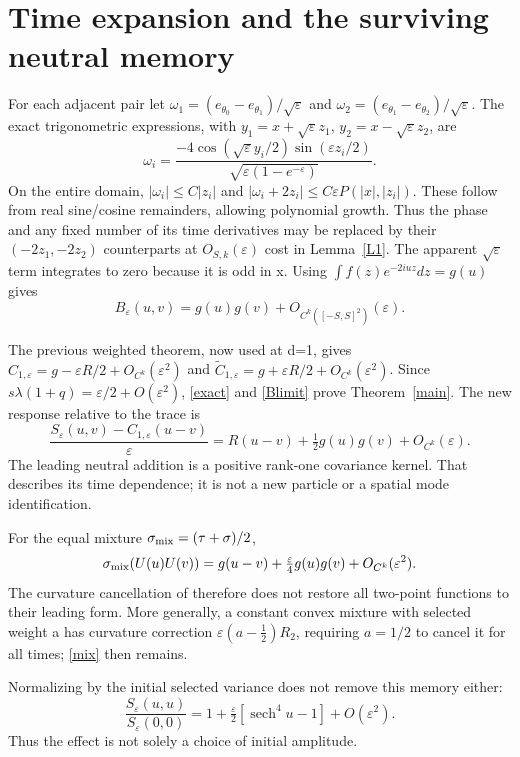\documentclass[11pt]{article}
\newcommand{\eps}{\varepsilon}
\newcommand{\sech}{\operatorname{sech}}
\newcommand{\tr}{\tau}
\begin{document}
\newpage
\section{Time expansion and the surviving neutral memory}
For each adjacent pair let
$\omega_1=(e_{\theta_0}-e_{\theta_1})/\sqrt\eps$ and
$\omega_2=(e_{\theta_1}-e_{\theta_2})/\sqrt\eps$.
The exact trigonometric expressions, with
$y_1=x+\sqrt\eps z_1$, $y_2=x-\sqrt\eps z_2$, are
\[
 \omega_i=
 \frac{-4\cos(\sqrt\eps y_i/2)\sin(\eps z_i/2)}
      {\sqrt{\eps(1-e^{-\eps})}}.
\]
On the entire domain, $|\omega_i|\le C|z_i|$ and
$|\omega_i+2z_i|\le C\eps P(|x|,|z_i|)$.
These follow from real sine/cosine remainders, allowing polynomial
growth. Thus the phase and any fixed number of its time derivatives
may be replaced by their $(-2z_1,-2z_2)$ counterparts at
$O_{S,k}(\eps)$ cost in Lemma~\ref{L1}. The apparent
$\sqrt\eps$ term integrates to zero because it is odd in x.
Using $\int f(z)e^{-2iuz}dz=g(u)$ gives
\begin{equation}\label{Blimit}
 B_\eps(u,v)=g(u)g(v)+O_{C^k([-S,S]^2)}(\eps).
\end{equation}

The previous weighted theorem, now used at d=1, gives
$C_{1,\eps}=g-\eps R/2+O_{C^k}(\eps^2)$ and
$\widetilde C_{1,\eps}=g+\eps R/2+O_{C^k}(\eps^2)$.
Since $s\lambda(1+q)=\eps/2+O(\eps^2)$,
\eqref{exact} and \eqref{Blimit} prove Theorem~\ref{main}.
The new response relative to the trace is
\[
 \frac{S_\eps(u,v)-C_{1,\eps}(u-v)}{\eps}
   =R(u-v)+\tfrac12g(u)g(v)+O_{C^k}(\eps).
\]
The leading neutral addition is a positive rank-one covariance
kernel. That describes its time dependence; it is not a new
particle or a spatial mode identification.

For the equal mixture $\sigma_{\rm mix}=(\tr+\sigma)/2$,
\begin{equation}\label{mix}
 \sigma_{\rm mix}(U(u)U(v))
 =g(u-v)+\tfrac{\eps}{4}g(u)g(v)+O_{C^k}(\eps^2).
\end{equation}
The curvature cancellation of \cite{weighted} therefore does
not restore all two-point functions to their leading form.
More generally, a constant convex mixture with selected weight a
has curvature correction $\eps(a-\tfrac12)R_2$, requiring
$a=1/2$ to cancel it for all times; \eqref{mix} then remains.

Normalizing by the initial selected variance does not remove
this memory either:
\[
 \frac{S_\eps(u,u)}{S_\eps(0,0)}
 =1+\tfrac{\eps}{2}[\sech^4u-1]+O(\eps^2).
\]
Thus the effect is not solely a choice of initial amplitude.
\end{document}
